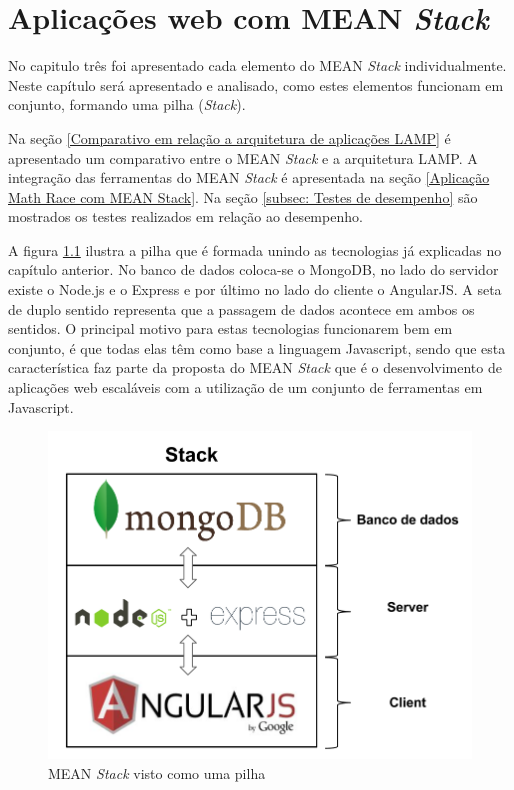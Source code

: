 \chapter{Aplicações web com MEAN \textit{Stack}}	 
\label{implementacao}


    No capitulo três foi apresentado cada elemento do MEAN \textit{Stack} individualmente. Neste capítulo será apresentado e analisado, como estes elementos funcionam em conjunto, formando uma pilha (\textit{Stack}).

Na seção \ref{Comparativo em relação a arquitetura de aplicações LAMP} é apresentado um comparativo entre o MEAN \textit{Stack} e a arquitetura LAMP. A integração das ferramentas do MEAN \textit{Stack} é apresentada na seção \ref{Aplicação Math Race com MEAN Stack}. Na seção \ref{subsec: Testes de desempenho}  são  mostrados os testes realizados em relação ao desempenho.

A figura \ref{fig:MEAN Stack visto como uma pilha} ilustra a pilha que é formada unindo as tecnologias já explicadas no capítulo anterior. No banco de dados coloca-se o MongoDB, no lado do servidor existe o Node.js e o Express e por último no lado do cliente o AngularJS. A seta de duplo sentido representa que a passagem de dados acontece em ambos os sentidos. O principal motivo para estas tecnologias funcionarem bem em conjunto, é que todas elas têm como base a linguagem Javascript, sendo que esta característica faz parte da proposta do MEAN \textit{Stack} que é o desenvolvimento de aplicações web escaláveis com a utilização de um conjunto de ferramentas em Javascript.
    
\begin{figure}[htb]
\centering
\includegraphics[scale=0.4]{images/mean_stack_diagram.png}
\caption{MEAN \textit{Stack} visto como uma pilha}
\label{fig:MEAN Stack visto como uma pilha}
\end{figure}

